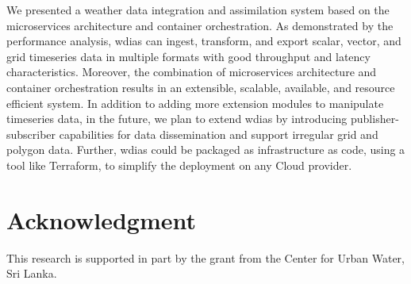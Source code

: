 \documentclass[conference]{IEEEtran}
\begin{document}
We presented a weather data integration and assimilation system based on the microservices architecture and container orchestration. As demonstrated by the performance analysis, \acrshort{wdias} can ingest, transform, and export scalar, vector, and grid timeseries data in multiple formats with good throughput and latency characteristics. Moreover, the combination of microservices architecture and container orchestration results in an extensible, scalable, available, and resource efficient system. In addition to adding more extension modules to manipulate timeseries data, in the future, we plan to extend \acrshort{wdias} by introducing publisher-subscriber capabilities for data dissemination and support irregular grid and polygon data. Further, \acrshort{wdias} could be packaged as infrastructure as code, using a tool like Terraform, to simplify the deployment on any Cloud provider. 

\section*{Acknowledgment}
\label{pse:ack}
This research is supported in part by the grant from the Center for Urban Water, Sri Lanka.

\graphicspath{ {./images/} }



\end{document}

